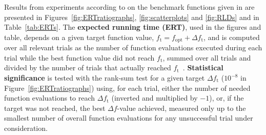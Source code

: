 \documentclass{sig-alternate}
\newcommand{\Df}{\ensuremath{\Delta f}}
\newcommand{\fopt}{\ensuremath{f_\mathrm{opt}}}
\newcommand{\ftarget}{\ensuremath{f_\mathrm{t}}}
\begin{document}
Results from experiments according to \cite{hansen2010exp} on the benchmark
functions given in \cite{wp200902_2010,hansen2010noi} are presented in
Figures~\ref{fig:ERTratiographs}, \ref{fig:scatterplots} and \ref{fig:RLDs} and
in Table~\ref{tab:ERTs}. The \textbf{expected running time (ERT)}, used in the figures and table, depends on a
given target function value, $\ftarget=\fopt+\Delta\ftarget$, and is computed over all relevant trials
as the number of function evaluations executed during each trial while the best
function value did not reach \ftarget, summed over all trials
and divided by the number of trials that actually reached \ftarget\
\cite{hansen2010exp,price1997dev}. 
\textbf{Statistical significance} is tested with the rank-sum test for a given
target $\Delta\ftarget$ ($10^{-8}$ in Figure~\ref{fig:ERTratiographs}) using,
for each trial, either the number of needed function evaluations to reach
$\Delta\ftarget$ (inverted and multiplied by $-1$), or, if the target was not
reached, the best $\Df$-value achieved, measured only up to the smallest number
of overall function evaluations for any unsuccessful trial under consideration. 
\end{document}
